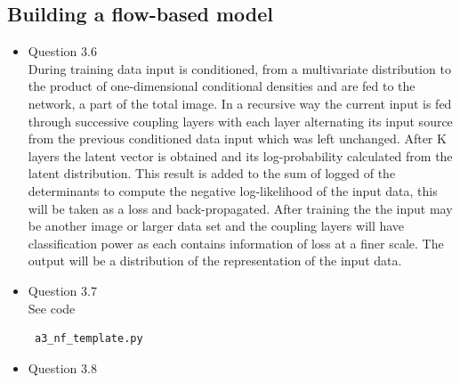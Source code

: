 \documentclass{article}
\begin{document}
      \subsection{Building a flow-based model}
        \begin{itemize}
          \item Question 3.6  \\
          During training data input is conditioned, from a multivariate distribution to the product of one-dimensional conditional densities and are fed to the network, a part of the total image. In a recursive way the current input is fed through successive coupling layers with each layer alternating its input source from the previous conditioned data input which was left unchanged. After K layers the latent vector is obtained and its log-probability calculated from the latent distribution. This result is added to the sum of logged of the determinants to compute the negative log-likelihood of the input data, this will be taken as a loss and back-propagated. After training the the input may be another image or larger data set and the coupling layers will have classification power as each contains information of loss at a finer scale. The output will be a distribution of the representation of the input data. 
          \item Question 3.7 \\ 
          See code \begin{verbatim} a3_nf_template.py\end{verbatim}
          \item Question 3.8
          \begin{figure}[htbp]
            \centering

\end{figure}
\end{itemize}
\end{document}
